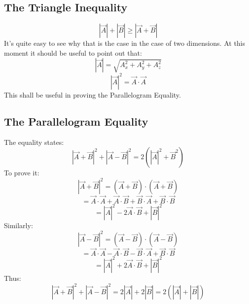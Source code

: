         \subsection{The Triangle Inequality}
            $$|\vec{A}| + |\vec{B}| \geq |\vec{A} + \vec{B}| $$
            It's quite easy to see why that is the case in the case of two dimensions.
            At this moment it should be useful to point out that:
            $$|\vec{A}| = \sqrt{A_x^2 + A_y^2 + A_z^2}$$
            $$|\vec{A}|^2 = \vec{A} \cdot \vec{A}$$
            This shall be useful in proving the Parallelogram Equality.
        
        \subsection{The Parallelogram Equality}
            The equality states:
            $$|\vec{A} + \vec{B}|^2 + |\vec{A} - \vec{B}|^2 = 2\left(|\vec{A}|^2+\vec{B}^2\right)$$
            To prove it:
            $$|\vec{A} + \vec{B}|^2 = \left(\vec{A}+\vec{B}\right)\cdot \left(\vec{A}+\vec{B}\right)$$
            $$= \vec{A}\cdot \vec{A} + \vec{A}\cdot \vec{B} + \vec{B}\cdot \vec{A} + \vec{B}\cdot \vec{B}$$
            $$= |\vec{A}|^2 -2\vec{A}\cdot \vec{B} + |\vec{B}|^2$$
            Similarly:
            $$|\vec{A} - \vec{B}|^2 = \left(\vec{A}-\vec{B}\right)\cdot \left(\vec{A}-\vec{B}\right)$$
            $$= \vec{A}\cdot \vec{A} - \vec{A}\cdot \vec{B} - \vec{B}\cdot \vec{A} + \vec{B}\cdot \vec{B}$$
            $$= |\vec{A}|^2 +2\vec{A}\cdot \vec{B} + |\vec{B}|^2$$
            Thus:
            $$|\vec{A} + \vec{B}|^2 + |\vec{A} - \vec{B}|^2 = 2|\vec{A}| + 2|\vec{B}| = 2\left(|\vec{A}| + |\vec{B}|\right)$$